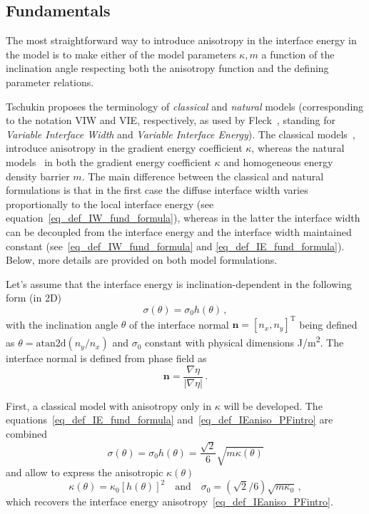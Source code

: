 	\subsection{Fundamentals}
	The most straightforward way to introduce anisotropy in the interface energy in the model is to make either of the model parameters $\kappa, m$ a function of the inclination angle respecting both the anisotropy function and the defining parameter relations. 
	
	Tschukin \cite{Tschukin2017} proposes the terminology of \textit{classical} and \textit{natural} models (corresponding to the notation VIW and VIE, respectively, as used by Fleck~\cite{Fleck2011}, standing for \textit{Variable Interface Width} and \textit{Variable Interface Energy}). The classical models~\cite{Kobayashi1993,McFadden1993,Taylor1998,Eggleston2001,Wheeler2006}, introduce anisotropy in the gradient energy coefficient $\kappa$, whereas the natural models~\cite{Ma2006,Torabi2009,Fleck2011,Moelans2008} in both the gradient energy coefficient $\kappa$ and homogeneous energy density barrier $m$. The main difference between the classical and natural formulations is that in the first case the diffuse interface width varies proportionally to the local interface energy (see equation~\eqref{eq_def_IW_fund_formula}), whereas in the latter the interface width can be decoupled from the interface energy and the interface width maintained constant (see~\eqref{eq_def_IW_fund_formula} and \eqref{eq_def_IE_fund_formula}). Below, more details are provided on both model formulations.
	
	Let's assume that the interface energy is inclination-dependent in the following form (in 2D)
	\begin{equation}\label{eq_def_IEaniso_PFintro}
		\sigma(\theta)=\sigma_0 h(\theta) \,,
	\end{equation}
	with the inclination angle $\theta$ of the interface normal $\bm{n}=[n_x,n_y]^\mathrm{T}$ being defined as $\theta = \mathrm{atan2d}(n_y/n_x)$ and $\sigma_0$ constant with physical dimensions \unit{\J/\m^2}. The interface normal is defined from phase field as
	\begin{equation}
		\bm{n} = \frac{\nabla\eta}{|\nabla\eta|} \,.
	\end{equation}
	
	First, a classical model with anisotropy only in $\kappa $ will be developed. The equations~\eqref{eq_def_IE_fund_formula} and~\eqref{eq_def_IEaniso_PFintro} are combined 
	\begin{equation}
		\sigma(\theta) = \sigma_0 h(\theta) = \frac{\sqrt{2}}{6}\sqrt{m\kappa(\theta)}
	\end{equation}
	and allow to express the anisotropic $\kappa(\theta)$
	\begin{equation}
		\kappa(\theta) = \kappa_0 [h(\theta)]^2 \quad \mathrm{and} \quad \sigma_0=(\sqrt{2}/6)\sqrt{m\kappa_0} \,,
	\end{equation}
	which recovers the interface energy anisotropy~\eqref{eq_def_IEaniso_PFintro}.
	
